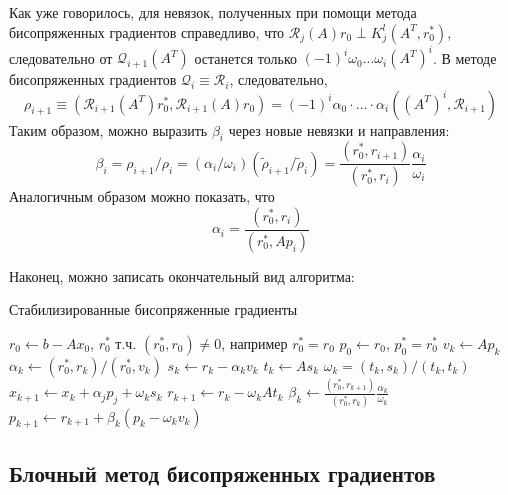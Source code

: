 Как уже говорилось, для невязок, полученных при помощи метода бисопряженных градиентов справедливо, что 
$\mathcal{R}_j(A)r_0 \perp K^l_{j} (A^T, r_0^*)$, следовательно от $\mathcal{Q}_{i+1}(A^T)$ останется только 
$(-1)^{i}\omega_0 ... \omega_i (A^T)^i$. В методе бисопряженных градиентов $\mathcal{Q}_i \equiv \mathcal{R}_i$, 
следовательно,
\begin{equation*}
    \rho_{i+1} \equiv (\mathcal{R}_{i+1}(A^T)r_0^*, \mathcal{R}_{i+1}(A)r_0) = (-1)^i\alpha_0 \cdot ... \cdot \alpha_i ((A^T)^i,\mathcal{R}_{i+1})
\end{equation*} 
Таким образом, можно выразить $\beta_i$ через новые невязки и направления:
\begin{equation}
    \beta_i = \rho_{i+1} / \rho_i = (\alpha_i/\omega_i)(\tilde{\rho}_{i+1} / \tilde{\rho}_i) = \frac{(r_0^*,r_{i+1})}{(r_0^*,r_i)}\frac{\alpha_i}{\omega_i}
\end{equation}
Аналогичным образом можно показать, что
\begin{equation}
    \alpha_i = \frac{(r_0^*,r_i)}{(r_0^*,Ap_i)}
\end{equation}

Наконец, можно записать окончательный вид алгоритма:
\begin{algorithm}[H]
    \caption{Стабилизированные бисопряженные градиенты}
    \begin{algorithmic}[1]
        \State $r_0 \gets b - A x_0$, $r_0^*$ т.ч. $(r_0^*,r_0) \neq 0$, например $r_0^*=r_0$ 
        \State $p_0 \gets r_0$, $p_0^*=r_0^*$
            \State $v_k \gets Ap_k$
            \State $\alpha_k \gets (r_0^*, r_k) / (r_0^*, v_k)$
            \State $s_k \gets r_k - \alpha_k v_k$
            \State $t_k \gets A s_k$
            \State $\omega_k = (t_k,s_k)/(t_k,t_k)$
            \State $x_{k+1} \gets x_k + \alpha_j p_j + \omega_k s_k$
            \State $r_{k+1} \gets r_k - \omega_k A t_k$
            \State $\beta_k \gets \frac{(r_0^*,r_{k+1})}{(r_0^*,r_k)}\frac{\alpha_k}{\omega_k}$
            \State $p_{k+1} \gets r_{k+1} + \beta_k (p_k - \omega_k v_k)$
        \EndFor
    \end{algorithmic}
\end{algorithm} 
 
\subsection[Блочный метод бисопряженных градиентов]{Блочный метод бисопряженных градиентов}

